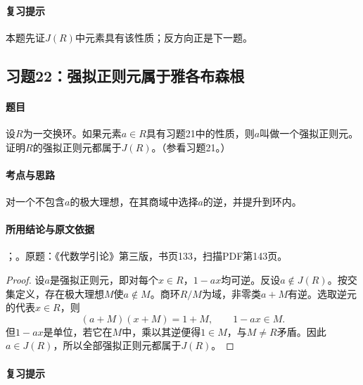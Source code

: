 \paragraph{复习提示}

本题先证$J(R)$中元素具有该性质；反方向正是下一题。



\subsection{习题22：强拟正则元属于雅各布森根}

\label{ex:3:22}

\paragraph{题目}

设$R$为一交换环。如果元素$a\in R$具有习题21中的性质，则$a$叫做一个强拟正则元。证明$R$的强拟正则元都属于$J(R)$。（参看习题21。）

\paragraph{考点与思路}

对一个不包含$a$的极大理想，在其商域中选择$a$的逆，并提升到环内。

\paragraph{所用结论与原文依据}

；。原题：《代数学引论》第三版，书页133，扫描PDF第143页。


\begin{proof}

设$a$是强拟正则元，即对每个$x\in R$，$1-ax$均可逆。反设$a\notin J(R)$。按交集定义，存在极大理想$M$使$a\notin M$。商环$R/M$为域，非零类$a+M$有逆。选取逆元的代表$x\in R$，则
\[
(a+M)(x+M)=1+M,
\qquad 1-ax\in M.
\]
但$1-ax$是单位，若它在$M$中，乘以其逆便得$1\in M$，与$M\ne R$矛盾。因此$a\in J(R)$，所以全部强拟正则元都属于$J(R)$。

\end{proof}

\paragraph{复习提示}

